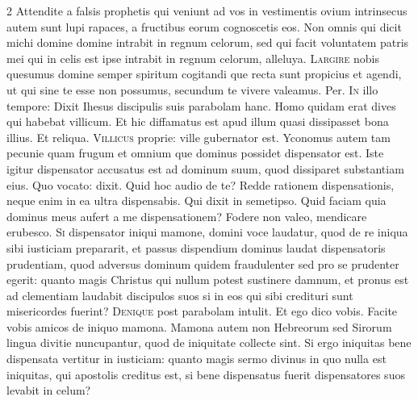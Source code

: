 \begin{multicols*}{2}
 Attendite a falsis prophetis qui veniunt ad vos in vestimentis ovium intrinsecus autem sunt lupi rapaces, a fructibus eorum cognoscetis eos.
 Non omnis qui dicit michi domine domine intrabit in regnum celorum, sed qui facit voluntatem patris mei qui in celis est ipse intrabit in regnum celorum, alleluya.
\lettrine[lines=2]{\zallmancaps \color{Red} L}{argire} nobis quesumus domine semper spiritum cogitandi que recta sunt propicius et agendi, ut qui sine te esse non possumus, secundum te vivere valeamus. Per.
\lettrine[lines=2]{\zallmancaps \color{Blue} I}{n} illo tempore: Dixit Ihesus discipulis suis parabolam hanc. Homo quidam erat dives qui habebat villicum. Et hic diffamatus est apud illum quasi dissipasset bona illius. Et reliqua.
\lettrine[lines=2]{\zallmancaps \color{Red} V}{illicus} proprie: ville gubernator est. Yconomus autem tam pecunie quam frugum et omnium que dominus possidet dispensator est. Iste igitur dispensator accusatus est ad dominum suum, quod dissiparet substantiam eius. Quo vocato: dixit. Quid hoc audio de te? Redde rationem dispensationis, neque enim in ea ultra dispensabis. Qui dixit in semetipso. Quid faciam quia dominus meus aufert a me dispensationem? Fodere non valeo, mendicare erubesco.
\lettrine[lines=2]{\zallmancaps \color{Blue} S}{i} dispensator iniqui mamone, domini voce laudatur, quod de re iniqua sibi iusticiam prepararit, et passus dispendium dominus laudat dispensatoris prudentiam, quod adversus dominum quidem fraudulenter sed pro se prudenter egerit: quanto magis Christus qui nullum potest sustinere damnum, et pronus est ad clementiam laudabit discipulos suos si in eos qui sibi credituri sunt misericordes fuerint?
\lettrine[lines=2]{\zallmancaps \color{Red} D}{enique} post parabolam intulit. Et ego dico vobis. Facite vobis amicos de iniquo mamona. Mamona autem non Hebreorum sed Sirorum lingua divitie nuncupantur, quod de iniquitate collecte sint. Si ergo iniquitas bene dispensata vertitur in iusticiam: quanto magis sermo divinus in quo nulla est iniquitas, qui apostolis creditus est, si bene dispensatus fuerit dispensatores suos levabit in celum?

\end{multicols*}
